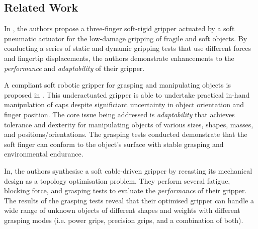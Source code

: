 \documentclass[lettersize,journal]{IEEEtran}
\begin{document}
%

\subsection{Related Work}\label{relatedwork}
In \cite{Cheng2021}, the authors propose a three-finger soft-rigid gripper actuated by a soft pneumatic actuator for the low-damage gripping of fragile and soft objects. 
By conducting a series of static and dynamic gripping tests that use different forces and fingertip displacements, the authors demonstrate enhancements to the \emph{performance} and \emph{adaptability} of their gripper.  %

A compliant soft robotic gripper for grasping and manipulating objects is proposed in \cite{Liu2021}.  This underactuated gripper is able to undertake practical in-hand manipulation of caps despite significiant uncertainty in object orientation and finger position.   
The core issue being addressed is \emph{adaptability} that achieves tolerance and dexterity for manipulating objects of various sizes, shapes, masses, and positions/orientations. 
The grasping tests conducted demonstrate that the soft finger can conform to the object’s surface with stable grasping and environmental endurance. 

In\cite{Chen2018}, the authors synthesise a soft cable-driven gripper by recasting its mechanical design as a topology optimisation problem. 
They perform several fatigue, blocking force, and grasping tests to evaluate the \emph{performance} of their gripper.  
The results of the grasping tests reveal that their optimised gripper can handle a wide range of unknown objects of different shapes and weights with different grasping modes (i.e. power grips, precision grips, and a combination of both).
\end{document}
